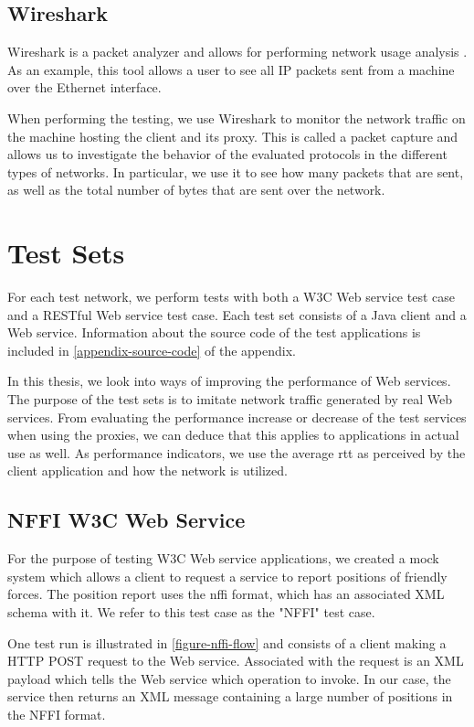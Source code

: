\subsection{Wireshark}

Wireshark is a packet analyzer and allows for performing network usage analysis
\cite{wireshark-homepage}. As an example, this tool allows a user to see all IP
packets sent from a machine over the Ethernet interface.

When performing the testing, we use Wireshark to monitor the network traffic on
the machine hosting the client and its proxy. This is called a packet capture
and allows us to investigate the behavior of the evaluated protocols in the
different types of networks. In particular, we use it to see how many packets
that are sent, as well as the total number of bytes that are sent over the
network.


\section{Test Sets}

For each test network, we perform tests with both a W3C Web service test case
and a RESTful Web service test case. Each test set consists of a Java client and
a Web service. Information about the source code of the test applications is
included in \cref{appendix-source-code} of the appendix.

In this thesis, we look into ways of improving the performance of Web services.
The purpose of the test sets is to imitate network traffic generated by real Web
services. From evaluating the performance increase or decrease of the test
services when using the proxies, we can deduce that this applies to applications
in actual use as well. As performance indicators, we use the average \gls{rtt} as
perceived by the client application and how the network is utilized.

\subsection{NFFI W3C Web Service}

For the purpose of testing W3C Web service applications, we created a mock
system which allows a client to request a service to report positions of
friendly forces. The position report uses the \gls{nffi} format, which has an
associated XML schema with it. We refer to this test case as the "NFFI" test
case.

One test run is illustrated in \cref{figure-nffi-flow} and consists of a client
making a HTTP POST request to the Web service. Associated with the request is an
XML payload which tells the Web service which operation to invoke. In our case,
the service then returns an XML message containing a large number of positions
in the NFFI format.

